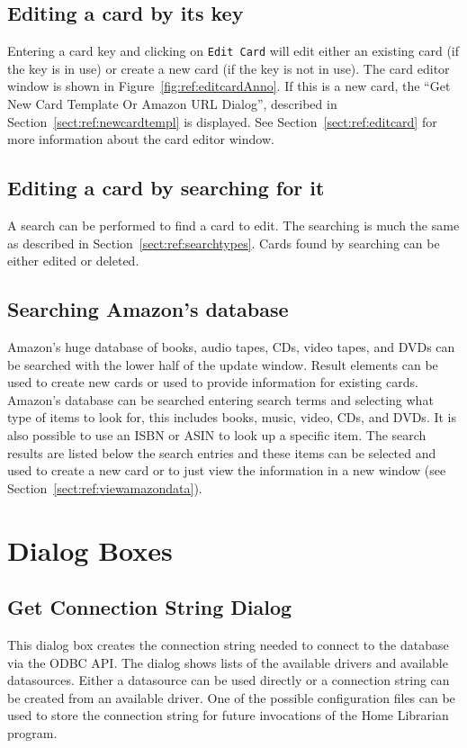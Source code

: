 \subsection{Editing a card by its key}
Entering a card key and clicking on \verb=Edit Card= will edit either
an existing card (if the key is in use) or create a new card (if the
key is not in use). The card editor window is shown in
Figure~\ref{fig:ref:editcardAnno}. If this is a new card, the ``Get New
Card Template Or Amazon URL Dialog'', described in
Section~\ref{sect:ref:newcardtempl} is displayed. See
Section~\ref{sect:ref:editcard} for more information about the card
editor window.

\subsection{Editing a card by searching for it}
A search can be performed to find a card to edit. The searching is much
the same as described in Section~\ref{sect:ref:searchtypes}. Cards found
by searching can be either edited or deleted.

\subsection{Searching Amazon's database}

Amazon's huge database of books, audio tapes, CDs, video tapes, and
DVDs can be searched with the lower half of the update window.  Result
elements can be used to create new cards or used to provide information
for existing cards.  Amazon's database can be searched  entering search
terms and selecting what type of items to look for, this includes
books, music, video, CDs, and DVDs.  It is also possible to use an ISBN
or ASIN to look up a specific item.  The search results are listed below
the search entries and these items can be selected and used to create a
new card or to just view the information in a new window (see
Section~\ref{sect:ref:viewamazondata}).

\section{Dialog Boxes}
\subsection{Get Connection String Dialog}
\label{sect:ref:getconnectionstring}
This dialog box creates the connection string needed to connect to the
database via the ODBC API. The dialog shows lists of the available
drivers and available datasources.  Either a datasource can be used
directly or a connection string can be created from an available
driver. One of the possible configuration files can be used to store
the connection string for future invocations of the Home Librarian
program.
